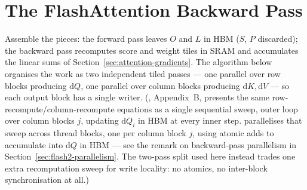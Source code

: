 \documentclass[11pt]{amsart}
\theoremstyle{plain}
\theoremstyle{definition}
\begin{document}
\section{The FlashAttention Backward Pass}
\label{sec:flashattention-backward}

Assemble the pieces: the forward pass leaves $O$ and $L$ in HBM ($S$, $P$
discarded); the backward pass recomputes score and weight tiles in SRAM and
accumulates the linear sums of Section~\ref{sec:attention-gradients}.  The
algorithm below organises the work as two independent tiled passes — one
parallel over row blocks producing $\mathrm{d}Q$, one parallel over column
blocks producing $\mathrm{d}K, \mathrm{d}V$ — so each output block has a
single writer.  (\cite{Dao2022}, Appendix~B, presents the same
row-recompute/column-recompute equations as a single sequential sweep,
outer loop over column blocks $j$, updating $\mathrm{d}Q_i$ in HBM at every
inner step.  \cite{Dao2023} parallelises that sweep across thread blocks,
one per column block $j$, using atomic adds to accumulate into
$\mathrm{d}Q$ in HBM — see the remark on backward-pass parallelism in
Section~\ref{sec:flash2-parallelism}.  The two-pass split used here instead
trades one extra recomputation sweep for write locality: no atomics, no
inter-block synchronisation at all.)
\end{document}
